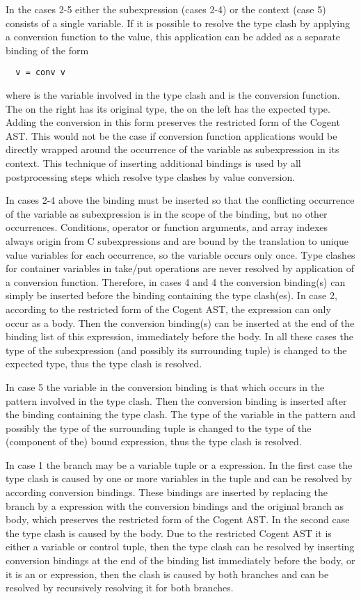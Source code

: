 In the cases 2-5 either the subexpression (cases 2-4) or the
context (case 5) consists of a single variable. If it is possible to resolve the type clash by applying a conversion function
to the value, this application can be added as a separate binding of the form
\begin{verbatim}
  v = conv v
\end{verbatim}
where  is the variable involved in the type clash and  is the conversion function. The  on the right
has its original type, the  on the left has the expected type. Adding the conversion
in this form preserves the restricted form of the Cogent AST. This would not be the case if conversion function applications
would be directly wrapped around the occurrence of the variable as subexpression in its context. This technique of inserting
additional bindings is used by all postprocessing steps which resolve type clashes by value conversion.

In cases 2-4 above the binding must be inserted so that the conflicting occurrence of the variable as subexpression is in the
scope of the binding, but no other occurrences. Conditions, operator or function arguments, and array indexes always origin from
C subexpressions and are bound by the translation to unique value variables for each occurrence, so the variable occurs only
once. Type clashes for container variables in take/put operations are never resolved by application of a conversion function.
Therefore, in cases 4 and 4 the conversion binding(s) can simply be inserted before the binding containing the type clash(es).
In case 2, according to the restricted form of the Cogent AST, the  expression can only occur as a  body.
Then the conversion binding(s) can be inserted at the end of the binding list of this  expression, immediately before
the body. In all these cases the type of the subexpression (and possibly its surrounding tuple) is changed to the expected type,
thus the type clash is resolved.

In case 5 the variable in the conversion binding is that which occurs in the pattern involved in the type clash. Then the conversion
binding is inserted after the binding containing the type clash. The type of the variable in the pattern and possibly the type
of the surrounding tuple is changed to the type of the (component of the) bound expression, thus the type clash is resolved.

In case 1 the branch may be a variable tuple or a  expression. In the first case the type clash is caused by one or
more variables in the tuple and can be resolved by according conversion bindings. These bindings are inserted by replacing the branch
by a  expression with the conversion bindings and the original branch as body, which preserves the restricted form
of the Cogent AST. In the second case the type clash is caused by the  body. Due to the restricted Cogent AST it is
either a variable or control tuple, then the type clash can be resolved by inserting conversion bindings at the end of the
binding list immediately before the body, or it is an  or  expression, then the clash is caused by both
branches and can be resolved by recursively resolving it for both branches.

